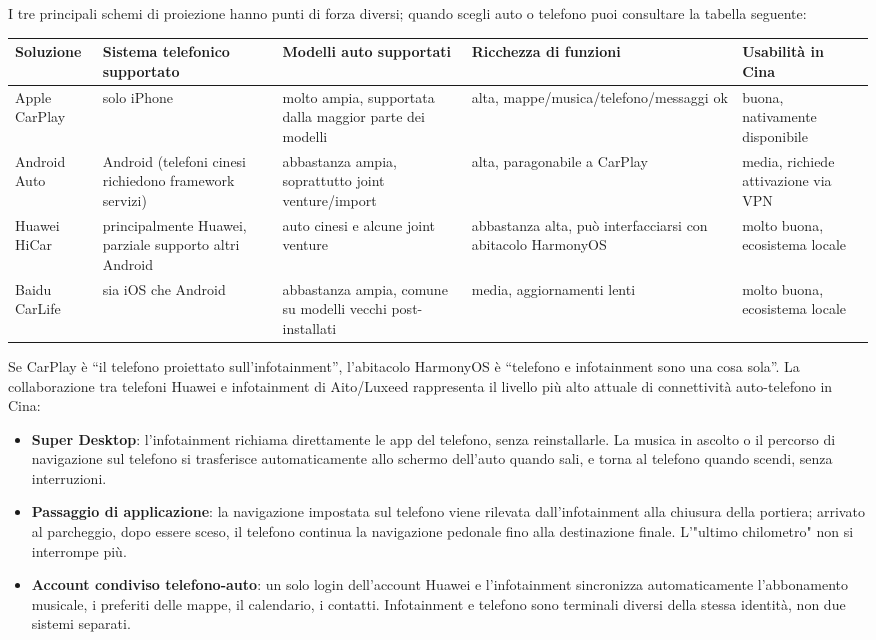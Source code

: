 I tre principali schemi di proiezione hanno punti di forza diversi; quando scegli auto o telefono puoi consultare la tabella seguente:

\begin{center}
\begin{tabularx}{\linewidth}{|X|X|X|X|X|}
\hline
\textbf{Soluzione} & \textbf{Sistema telefonico supportato} & \textbf{Modelli auto supportati} & \textbf{Ricchezza di funzioni} & \textbf{Usabilità in Cina} \tabularnewline
\hline
Apple CarPlay & solo iPhone & molto ampia, supportata dalla maggior parte dei modelli & alta, mappe/musica/telefono/messaggi ok & buona, nativamente disponibile \tabularnewline
Android Auto & Android (telefoni cinesi richiedono framework servizi) & abbastanza ampia, soprattutto joint venture/import & alta, paragonabile a CarPlay & media, richiede attivazione via VPN \tabularnewline
Huawei HiCar & principalmente Huawei, parziale supporto altri Android & auto cinesi e alcune joint venture & abbastanza alta, può interfacciarsi con abitacolo HarmonyOS & molto buona, ecosistema locale \tabularnewline
Baidu CarLife & sia iOS che Android & abbastanza ampia, comune su modelli vecchi post-installati & media, aggiornamenti lenti & molto buona, ecosistema locale \tabularnewline
\hline
\end{tabularx}
\end{center}


Se CarPlay è “il telefono proiettato sull'infotainment”, l'abitacolo HarmonyOS è “telefono e infotainment sono una cosa sola”. La collaborazione tra telefoni Huawei e infotainment di Aito/Luxeed rappresenta il livello più alto attuale di connettività auto-telefono in Cina:

\begin{itemize}
  \item \textbf{Super Desktop}: l'infotainment richiama direttamente le app del telefono, senza reinstallarle. La musica in ascolto o il percorso di navigazione sul telefono si trasferisce automaticamente allo schermo dell'auto quando sali, e torna al telefono quando scendi, senza interruzioni.
  \item \textbf{Passaggio di applicazione}: la navigazione impostata sul telefono viene rilevata dall'infotainment alla chiusura della portiera; arrivato al parcheggio, dopo essere sceso, il telefono continua la navigazione pedonale fino alla destinazione finale. L'"ultimo chilometro" non si interrompe più.
  \item \textbf{Account condiviso telefono-auto}: un solo login dell'account Huawei e l'infotainment sincronizza automaticamente l'abbonamento musicale, i preferiti delle mappe, il calendario, i contatti. Infotainment e telefono sono terminali diversi della stessa identità, non due sistemi separati.
\end{itemize}

